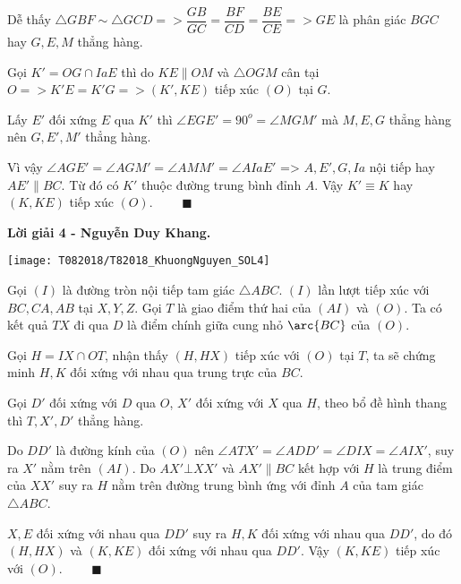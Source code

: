 Dễ thấy $\triangle GBF \sim \triangle GCD => \dfrac{GB}{GC}=\dfrac{BF}{CD}=\dfrac{BE}{CE} => GE$ là phân giác $BGC$ hay $G,E,M$ thẳng hàng.

Gọi $K'=OG \cap IaE$ thì do $KE \parallel OM$ và $\triangle OGM$ cân tại $O => K'E=K'G => (K',KE)$ tiếp xúc $(O)$ tại $G$.

Lấy $E'$ đối xứng $E$ qua $K'$ thì $\angle EGE'=90^o=\angle MGM'$ mà $M,E,G$ thẳng hàng nên $G,E',M'$ thẳng hàng.

Vì vậy $\angle AGE'=\angle AGM'=\angle AMM'=\angle AIaE'$ => $A,E',G,Ia$ nội tiếp hay $AE'\parallel BC$. Từ đó có $K'$ thuộc đường trung bình đỉnh $A$. Vậy $K' \equiv K $ hay $(K,KE)$ tiếp xúc $(O)$. $\qquad \blacksquare$

\textbf{Lời giải 4 - Nguyễn Duy Khang.}

\begin{center}
	\texttt{[image: T082018/T82018\_KhuongNguyen\_SOL4]}
	
\end{center}

Gọi $(I)$ là đường tròn nội tiếp tam giác $\triangle ABC$. $(I)$ lần lượt tiếp xúc với $BC, CA, AB$ tại $X, Y, Z$. Gọi $T$ là giao điểm thứ hai của $(AI)$ và $(O)$. Ta có kết quả $TX$ đi qua $D$ là điểm chính giữa cung nhỏ $\arc {BC}$ của $(O)$.

Gọi $H = IX \cap OT$, nhận thấy $(H, HX)$ tiếp xúc với $(O)$ tại $T$, ta sẽ chứng minh $H, K$ đối xứng với nhau qua trung trực của $BC$.

Gọi $D'$ đối xứng với $D$ qua $O$, $X'$ đối xứng với $X$ qua $H$, theo bổ đề hình thang thì $T, X', D'$ thẳng hàng.

Do $DD'$ là đường kính của $(O)$ nên $\angle ATX' = \angle ADD' = \angle DIX = \angle AIX'$, suy ra $X'$ nằm trên $(AI)$. Do $AX' \bot XX'$ và $AX' \parallel BC$ kết hợp với $H$ là trung điểm của $XX'$ suy ra $H$ nằm trên đường trung bình ứng với đỉnh $A$ của tam giác $\triangle ABC$.

$X, E$ đối xứng với nhau qua $DD'$ suy ra $H, K$ đối xứng với nhau qua $DD'$, do đó $(H, HX)$ và $(K, KE)$ đối xứng với nhau qua $DD'$. Vậy $(K, KE)$ tiếp xúc với $(O)$. $\qquad \blacksquare$